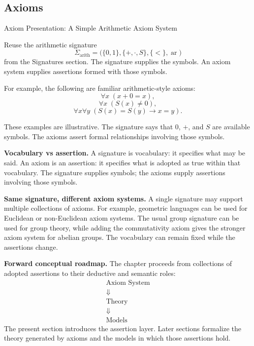 \subsection*{Axioms}
\label{sec:axiom-systems-axioms}

\begin{topicbox}{Axiom Presentation: A Simple Arithmetic Axiom System}
\begin{exposition}
Reuse the arithmetic signature
\[
  \Sigma_{\mathrm{arith}}
  =
  \bigl(
    \{0,1\},
    \{+,\cdot,S\},
    \{<\},
    \operatorname{ar}
  \bigr)
\]
from the Signatures section. The signature supplies the symbols. An axiom
system supplies assertions formed with those symbols.

For example, the following are familiar arithmetic-style axioms:
\[
  \forall x\;(x+0=x),
\]
\[
  \forall x\;(S(x)\neq 0),
\]
\[
  \forall x\forall y\;
  (S(x)=S(y)\rightarrow x=y).
\]

These examples are illustrative. The signature says that $0$, $+$, and $S$
are available symbols. The axioms assert formal relationships involving those
symbols.
\end{exposition}
\end{topicbox}


\begin{remark*}
\textbf{Vocabulary vs assertion.}
A signature is vocabulary: it specifies what may be said. An axiom is an
assertion: it specifies what is adopted as true within that vocabulary. The
signature supplies symbols; the axioms supply assertions involving those
symbols.

\textbf{Same signature, different axiom systems.}
A single signature may support multiple collections of axioms. For example,
geometric languages can be used for Euclidean or non-Euclidean axiom systems.
The usual group signature can be used for group theory, while adding the
commutativity axiom gives the stronger axiom system for abelian groups. The
vocabulary can remain fixed while the assertions change.

\textbf{Forward conceptual roadmap.}
The chapter proceeds from collections of adopted assertions to their deductive
and semantic roles:
\[
\begin{array}{c}
\text{Axiom System}\\
\Downarrow\\
\text{Theory}\\
\Downarrow\\
\text{Models}
\end{array}
\]
The present section introduces the assertion layer. Later sections formalize
the theory generated by axioms and the models in which those assertions hold.
\end{remark*}

